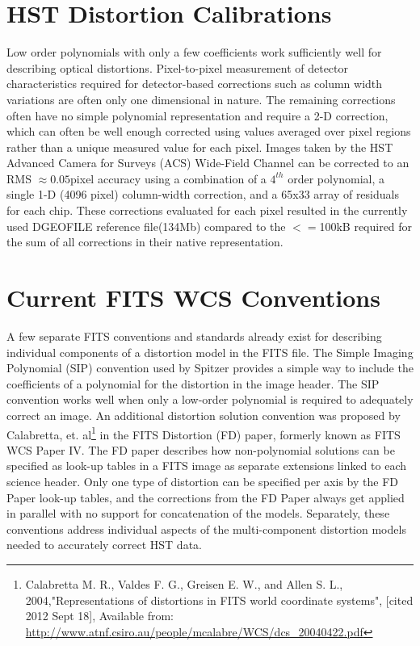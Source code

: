 \documentclass[11pt,twoside]{article}
\begin{document}
\section{HST Distortion Calibrations}
Low order polynomials with only a few coefficients work sufficiently well for describing optical distortions. Pixel-to-pixel measurement of detector characteristics required for detector-based corrections such as column width variations are often only one dimensional in nature.  The remaining corrections often have no simple polynomial representation and require a 2-D correction, which can often be well enough corrected using values averaged over pixel regions rather than a unique measured value for each pixel. Images taken by the HST Advanced Camera for Surveys (ACS) Wide-Field Channel can be corrected to an RMS $\approx 0.05$pixel accuracy using a combination of a $4^{th}$ order polynomial, a single 1-D (4096 pixel) column-width correction, and a 65x33 array of residuals for each chip. These corrections evaluated for each pixel resulted in the currently used DGEOFILE reference file(134Mb) compared to the $<=$100kB required for the sum of all corrections in their native representation. 


\section{Current FITS WCS Conventions}
A few separate FITS conventions and standards already exist for describing individual components of a distortion model in the FITS file. The Simple Imaging Polynomial (SIP)\citep{shupe_2005} convention used by Spitzer provides a simple way to include the coefficients of a polynomial for the distortion in the image header. The SIP convention works well when only a low-order polynomial is required to adequately correct an image. An additional distortion solution convention was proposed by Calabretta, et. al\footnote{Calabretta M. R., Valdes F. G., Greisen E. W., and Allen S. L., 2004,"Representations of distortions in FITS world coordinate systems", [cited 2012 Sept 18], Available from: \url{http://www.atnf.csiro.au/people/mcalabre/WCS/dcs_20040422.pdf}} in the FITS Distortion (FD) paper, formerly known as FITS WCS Paper IV. The FD paper describes how non-polynomial solutions can be specified as look-up tables in a FITS image as separate extensions linked to each science header.  Only one type of distortion can be specified per axis by the FD Paper look-up tables, and the corrections from the FD Paper always get applied in parallel with no support for concatenation of the models.  Separately, these conventions address individual aspects of the multi-component distortion models needed to accurately correct HST data.
\end{document}
